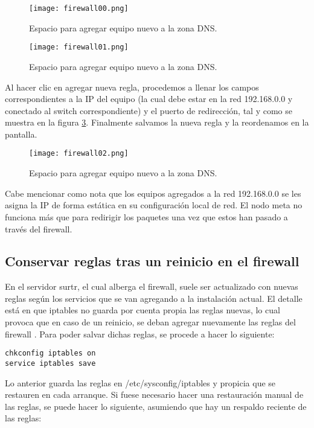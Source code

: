 \begin{figure}[H]
\centering
\texttt{[image: firewall00.png]}
\caption{Espacio para agregar equipo nuevo a la zona DNS.}
\label{fig:firewall:00}
\end{figure}

\begin{figure}[H]
\centering
\texttt{[image: firewall01.png]}
\caption{Espacio para agregar equipo nuevo a la zona DNS.}
\label{fig:firewall:01}
\end{figure}

Al hacer clic en agregar nueva regla, procedemos a llenar los campos correspondientes a la IP del equipo (la cual debe estar en la red 192.168.0.0 y conectado al switch correspondiente) y el puerto de redirección, tal y como se muestra en la figura \ref{fig:firewall:02}. Finalmente salvamos la nueva regla y la reordenamos en la pantalla.

\begin{figure}[H]
\centering
\texttt{[image: firewall02.png]}
\caption{Espacio para agregar equipo nuevo a la zona DNS.}
\label{fig:firewall:02}
\end{figure}

Cabe mencionar como nota que los equipos agregados a la red 192.168.0.0 se les asigna la IP de forma estática en su configuración local de red. El nodo meta no funciona más que para redirigir los paquetes una vez que estos han pasado a través del firewall.

\subsection{Conservar reglas tras un reinicio en el firewall}
En el servidor surtr, el cual alberga el firewall, suele ser actualizado con nuevas reglas según los servicios que se van agregando a la instalación actual. El detalle está en que iptables no guarda por cuenta propia las reglas nuevas, lo cual provoca que en caso de un reinicio, se deban agregar nuevamente las reglas del firewall \cite{iptables-save}. Para poder salvar dichas reglas, se procede a hacer lo siguiente:

\begin{lstlisting}
chkconfig iptables on
service iptables save
\end{lstlisting}

Lo anterior guarda las reglas en /etc/sysconfig/iptables y propicia que se restauren en cada arranque. Si fuese necesario hacer una restauración manual de las reglas, se puede hacer lo siguiente, asumiendo que hay un respaldo reciente de las reglas:

